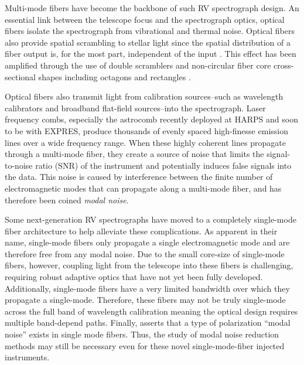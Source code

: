 \documentclass[twocolumn]{emulateapj}
\begin{document}
Multi-mode fibers have become the backbone of such RV spectrograph design. An essential link between the telescope focus and the spectrograph optics, optical fibers isolate the spectrograph from vibrational and thermal noise. Optical fibers also provide spatial scrambling to stellar light since the spatial distribution of a fiber output is, for the most part, independent of the input \citep{Hunter1992}. This effect has been amplified through the use of double scramblers \citep{Halverson2015a, Spronck2015} and non-circular fiber core cross-sectional shapes including octagons and rectangles \citep{Chazelas2010, SPronck2012, Plavchan2013}.

Optical fibers also transmit light from calibration sources--such as wavelength calibrators and broadband flat-field sources--into the spectrograph. Laser frequency combs, especially the  astrocomb \citep{Probst2014} recently deployed at HARPS and soon to be with EXPRES, produce thousands of evenly spaced high-finesse emission lines over a wide frequency range. When these highly coherent lines propagate through a multi-mode fiber, they create a source of noise that limits the signal-to-noise ratio (SNR) of the instrument and potentially induces false signals into the data. This noise is caused by interference between the finite number of electromagnetic modes that can propagate along a multi-mode fiber, and has therefore been coined \textit{modal noise}.

Some next-generation RV spectrographs \citep[e.g. iLocater,][]{Crepp2016} have moved to a completely single-mode fiber architecture to help alleviate these complications. As apparent in their name, single-mode fibers only propagate a single electromagnetic mode and are therefore free from any modal noise. Due to the small core-size of single-mode fibers, however, coupling light from the telescope into these fibers is challenging, requiring robust adaptive optics that have not yet been fully developed. Additionally, single-mode fibers have a very limited bandwidth over which they propagate a single-mode. Therefore, these fibers may not be truly single-mode across the full band of wavelength calibration meaning the optical design requires multiple band-depend paths. Finally, \citet{Halverson2015b} asserts that a type of polarization ``modal noise'' exists in single mode fibers. Thus, the study of modal noise reduction methods may still be necessary even for these novel single-mode-fiber injected instruments.
\end{document}
